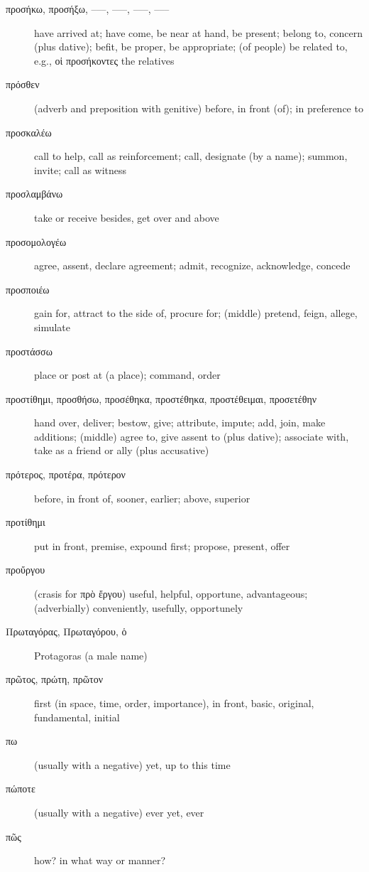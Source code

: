 \documentclass[12pt,letterpaper]{article}
\begin{document}
\begin{description}
    \item[\textgreek{προσήκω, προσήξω, –––, –––, –––, –––}] \marginnote{*}have arrived at; have come, be near at hand, be present; belong to, concern (plus dative); befit, be proper, be appropriate; (of people) be related to, e.g., \textgreek{οἱ προσήκοντες} the relatives
    \item[\textgreek{πρόσθεν}] (adverb and preposition with genitive) before, in front (of); in preference to
    \item[\textgreek{προσκαλέω}] call to help, call as reinforcement; call, designate (by a name); summon, invite; call as witness
    \item[\textgreek{προσλαμβάνω}] take or receive besides, get over and above
    \item[\textgreek{προσομολογέω}] agree, assent, declare agreement; admit, recognize, acknowledge, concede
    \item[\textgreek{προσποιέω}] gain for, attract to the side of, procure for; (middle) pretend, feign, allege, simulate
    \item[\textgreek{προστάσσω}] place or post at (a place); command, order
    \item[\textgreek{προστίθημι, προσθήσω, προσέθηκα, προστέθηκα, προστέθειμαι, προσετέθην}] \marginnote{*}hand over, deliver; bestow, give; attribute, impute; add, join, make additions; (middle) agree to, give assent to (plus dative); associate with, take as a friend or ally (plus accusative)
    \item[\textgreek{πρότερος, προτέρα, πρότερον}] \marginnote{*}before, in front of, sooner, earlier; above, superior
    \item[\textgreek{προτίθημι}] put in front, premise, expound first; propose, present, offer
    \item[\textgreek{προὔργου}] (crasis for \textgreek{πρὸ ἔργου}) useful, helpful, opportune, advantageous; (adverbially) conveniently, usefully, opportunely
    \item[\textgreek{Πρωταγόρας, Πρωταγόρου, ὁ}] Protagoras (a male name)
    \item[\textgreek{πρῶτος, πρώτη, πρῶτον}] \marginnote{*}first (in space, time, order, importance), in front, basic, original, fundamental, initial
    \item[\textgreek{πω}] (usually with a negative) yet, up to this time
    \item[\textgreek{πώποτε}] (usually with a negative) ever yet, ever
    \item[\textgreek{πῶς}] \marginnote{*}how? in what way or manner?

\end{description}
\end{document}
